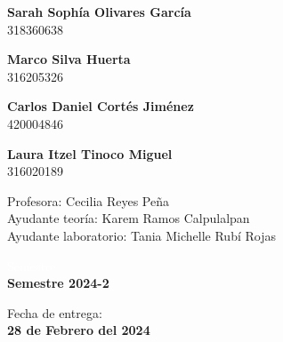 \begin{titlepage}
\begin{minipage}{0.4\textwidth}
        \textbf{\large{Sarah Sophía Olivares García}}\\
        318360638
\end{minipage}
\begin{minipage}{0.4\textwidth}
    \begin{flushright}
        \textbf{\large{Marco Silva Huerta}}\\
        316205326        
    \end{flushright}
\end{minipage}

\vspace{5mm}

\begin{minipage}{0.4\textwidth}
        \textbf{\large{Carlos Daniel Cortés Jiménez}}\\    
        420004846        
\end{minipage}
\begin{minipage}{0.4\textwidth}
    \begin{flushright}
        \textbf{\large{Laura Itzel Tinoco Miguel}}\\
        316020189
    \end{flushright}
\end{minipage}

\vspace{10mm}

\begin{minipage}{0.8\textwidth}
    \begin{flushleft} \large
        Profesora: Cecilia Reyes Peña\\
        Ayudante teoría: Karem Ramos Calpulalpan \\
        Ayudante laboratorio: Tania Michelle Rubí Rojas\\                    
    \end{flushleft}
\end{minipage}

\vspace{20mm}

\begin{minipage}{0.4\textwidth}
    \textcolor{white}{Semestre}\\
    \large\textbf{Semestre 2024-2}      
\end{minipage}
\begin{minipage}{0.4\textwidth}
    \begin{flushright}
        {\large Fecha de entrega:\\
         \textbf{28 de Febrero del 2024}}
    \end{flushright}
\end{minipage}

\makeatother

\vfill 
\end{titlepage}